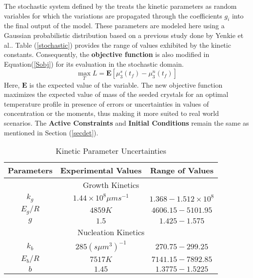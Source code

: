 \documentclass[3p,times,authoryear]{elsarticle}
\begin{document}
The stochastic system defined by the  treats the kinetic parameters as random variables for which the variations are propagated through the coefficients $g_{i}$ into the final output of the model. These parameters are modeled here using a Gaussian probabilistic distribution based on a previous study done by Yenkie et al.\cite{yenkie}. Table (\ref{stochastic}) provides the range of values exhibited by the kinetic constants. Consequently, the \textbf{objective function} is also modified in Equation(\ref{Sobj}) for its evaluation in the stochastic domain.   
\begin{equation} \label{Sobj}
\max_{T} L = \mathbf{E}\left[ \mu_{3}^{s}(t_{f}) - \mu_{3}^{n}(t_{f})\right]
\end{equation}
Here, $\mathbf{E}$ is the expected value of the variable. The new objective function
maximizes the expected value of mass of the seeded crystals for an optimal temperature profile in presence of errors or uncertainties in values of concentration or the moments, thus making it more suited to real world scenarios. The \textbf{Active Constraints} and \textbf{Initial Conditions} remain the same as mentioned in Section (\ref{secdet}).

\begin{center}
\begin{table}[!h] \label{stochastic}
\centering
\caption{Kinetic Parameter Uncertainties\cite{hu,shi,paeng}}
\begin{tabular}{|c|c|c|} 
\hline
Parameters & Experimental Values & Range of Values\\
\hline
\multicolumn{3}{|c|}{Growth Kinetics} \\
\hline
$k_{g}$ & $1.44\times10^{8} \mu m s^{-1}$ & $1.368 - 1.512\times10^{8} $\\
$E_{g}/R$ & $4859K$ & $4606.15-5101.95$\\
$g$ & $1.5$ & $1.425-1.575$\\
\hline
\multicolumn{3}{|c|}{Nucleation Kinetics} \\
\hline
$k_{b}$ & $285 (s \mu m^{3})^{-1}$ & $270.75-299.25$\\ 
$E_{b}/R$ & $7517K$ & $7141.15-7892.85$\\
$b$ & $1.45$ & $1.3775-1.5225$\\
\hline
\end{tabular}

\label{Table3}
\end{table}
\end{center}
\end{document}
